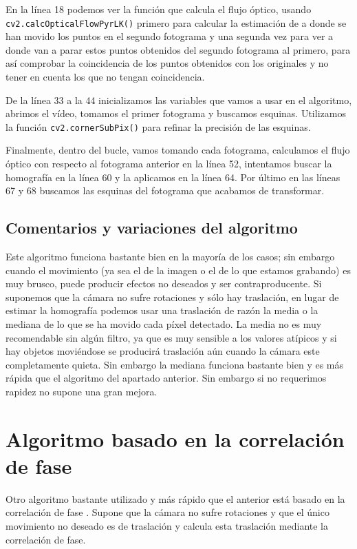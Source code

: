 \documentclass[a4paper,openright, 12pt]{book}
\begin{document}
En la línea 18 podemos ver la función que calcula el flujo óptico, usando \lstinline|cv2.calcOpticalFlowPyrLK()| primero para calcular la estimación de a donde se han movido los puntos en el segundo fotograma y una segunda vez para ver a donde van a parar estos puntos obtenidos del segundo fotograma al primero, para así comprobar la coincidencia de los puntos obtenidos con los originales y no tener en cuenta los que no tengan coincidencia.

De la línea 33 a la 44 inicializamos las variables que vamos a usar en el algoritmo, abrimos el vídeo, tomamos el primer fotograma y buscamos esquinas. Utilizamos la función \lstinline|cv2.cornerSubPix()| para refinar la precisión de las esquinas.

Finalmente, dentro del bucle, vamos tomando cada fotograma, calculamos el flujo óptico con respecto al fotograma anterior en la línea 52, intentamos buscar la homografía en la línea 60 y la aplicamos en la línea 64. Por último en las líneas 67 y 68 buscamos las esquinas del fotograma que acabamos de transformar.
 
\subsection{Comentarios y variaciones del algoritmo}
Este algoritmo funciona bastante bien en la mayoría de los casos; sin embargo cuando el movimiento (ya sea el de la imagen o el de lo que estamos grabando) es muy brusco, puede producir efectos no deseados y ser contraproducente. Si suponemos que la cámara no sufre rotaciones y sólo hay traslación, en lugar de estimar la homografía podemos usar una traslación de razón la media o la mediana de lo que se ha movido cada píxel detectado. La media no es muy recomendable sin algún filtro, ya que es muy sensible a los valores atípicos y si hay objetos moviéndose se producirá traslación aún cuando la cámara este completamente quieta. Sin embargo la mediana funciona bastante bien y es más rápida que el algoritmo del apartado anterior. Sin embargo si no requerimos rapidez no supone una gran mejora.
\newpage
\section{Algoritmo basado en la correlación de fase}
Otro algoritmo bastante utilizado y más rápido que el anterior está basado en la correlación de fase \cite{kug75}. Supone que la cámara no sufre rotaciones y que el único movimiento no deseado es de traslación y calcula esta traslación mediante la correlación de fase.
\end{document}
